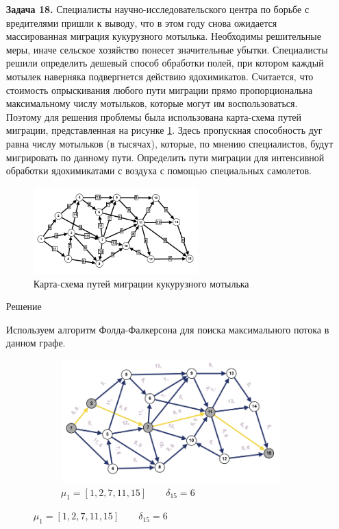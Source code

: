 \documentclass{article}
\begin{document}
\begin{enumerate}
\item[\textbf{Задача 18.}]  Специалисты научно-исследовательского центра по борьбе с вредителями пришли к выводу, что в этом году снова ожидается массированная миграция кукурузного мотылька. Необходимы решительные меры, иначе сельское хозяйство понесет значительные убытки. Специалисты решили определить дешевый способ обработки полей, при котором каждый мотылек наверняка подвергнется действию ядохимикатов. Считается, что стоимость опрыскивания любого пути миграции прямо пропорциональна максимальному числу мотыльков, которые могут им воспользоваться. Поэтому для решения проблемы была использована карта-схема путей миграции, представленная на рисунке \ref{fig:18_graph}. Здесь пропускная способность дуг равна числу мотыльков (в тысячах), которые, по мнению специалистов, будут мигрировать по данному пути. Определить пути миграции для интенсивной обработки ядохимикатами с воздуха с помощью специальных самолетов.
\begin{figure}[ht]
    \centering
    \includegraphics[width=0.6\textwidth, center]{attachments/18/18_0.png}
    \caption{Карта-схема путей миграции кукурузного мотылька}
    \label{fig:18_graph}
\end{figure}
\begin{center}
Решение 
\end{center}
Используем алгоритм Фолда-Фалкерсона для поиска максимального потока в данном графе.
\begin{figure}
    \centering
    \begin{subfigure}[b]{0.45\textwidth}
         \centering
         \caption*{\small{$\mu_1 = [1,2,7,11,15]\qquad \delta_{15}=6$}}
         \includegraphics[width=\textwidth]{attachments/18/18_1.png}

\end{subfigure}
\end{figure}
\end{enumerate}
\end{document}
